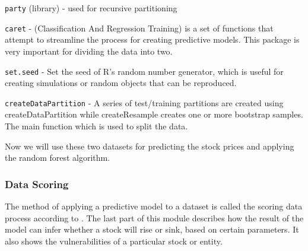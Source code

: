 \documentclass[
  11pt,
]{article}
\newenvironment{Shaded}{\begin{snugshade}}{\end{snugshade}}
\newcommand{\CommentTok}[1]{\textcolor[rgb]{0.56,0.35,0.01}{\textit{#1}}}
\newcommand{\DataTypeTok}[1]{\textcolor[rgb]{0.13,0.29,0.53}{#1}}
\newcommand{\DecValTok}[1]{\textcolor[rgb]{0.00,0.00,0.81}{#1}}
\newcommand{\FloatTok}[1]{\textcolor[rgb]{0.00,0.00,0.81}{#1}}
\newcommand{\KeywordTok}[1]{\textcolor[rgb]{0.13,0.29,0.53}{\textbf{#1}}}
\newcommand{\NormalTok}[1]{#1}
\newcommand{\OperatorTok}[1]{\textcolor[rgb]{0.81,0.36,0.00}{\textbf{#1}}}
\newcommand{\OtherTok}[1]{\textcolor[rgb]{0.56,0.35,0.01}{#1}}
\newcommand{\StringTok}[1]{\textcolor[rgb]{0.31,0.60,0.02}{#1}}
\begin{document}
\begin{Shaded}
\end{Shaded}

\texttt{party} (library) - used for recursive partitioning

\texttt{caret} - (Classification And Regression Training) is a set of
functions that attempt to streamline the process for creating predictive
models. This package is very important for dividing the data into two.

\texttt{set.seed} - Set the seed of R's random number generator, which
is useful for creating simulations or random objects that can be
reproduced.

\texttt{createDataPartition} - A series of test/training partitions are
created using createDataPartition while createResample creates one or
more bootstrap samples. The main function which is used to split the
data.

Now we will use these two datasets for predicting the stock prices and
applying the random forest algorithm.

\hypertarget{data-scoring}{%
\subsubsection{Data Scoring}\label{data-scoring}}

The method of applying a predictive model to a dataset is called the
scoring data process according to \citet{HibaSadia2019}. The last part
of this module describes how the result of the model can infer whether a
stock will rise or sink, based on certain parameters. It also shows the
vulnerabilities of a particular stock or entity.
\end{document}
